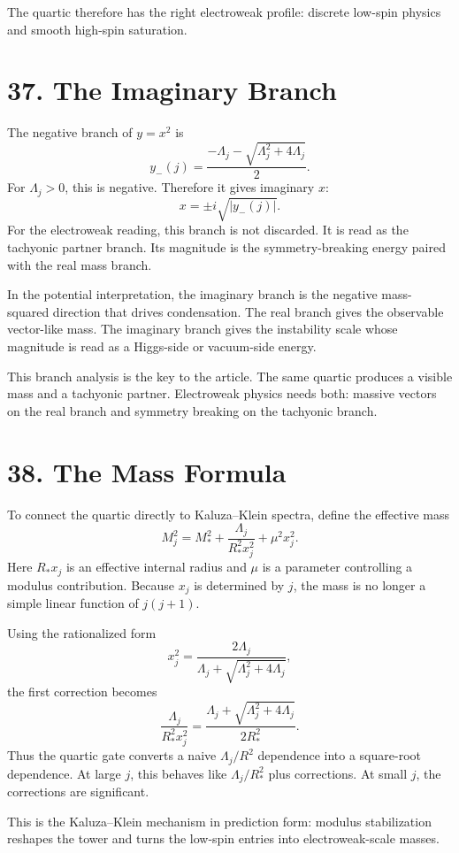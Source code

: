 \documentclass[11pt]{article}
\newcommand{\Lspin}{\Lambda_j}
\begin{document}
The quartic therefore has the right electroweak profile: discrete low-spin physics and smooth high-spin saturation.


\section*{37. The Imaginary Branch}

The negative branch of \(y=x^2\) is
\[
        y_-(j)=
        \frac{-\Lspin-\sqrt{\Lspin^2+4\Lspin}}{2}.
\]
For \(\Lspin>0\), this is negative. Therefore it gives imaginary \(x\):
\[
        x=\pm i\sqrt{|y_-(j)|}.
\]
For the electroweak reading, this branch is not discarded. It is read as the tachyonic partner branch. Its magnitude is the symmetry-breaking energy paired with the real mass branch.

In the potential interpretation, the imaginary branch is the negative mass-squared direction that drives condensation. The real branch gives the observable vector-like mass. The imaginary branch gives the instability scale whose magnitude is read as a Higgs-side or vacuum-side energy.

This branch analysis is the key to the article. The same quartic produces a visible mass and a tachyonic partner. Electroweak physics needs both: massive vectors on the real branch and symmetry breaking on the tachyonic branch.


\section*{38. The Mass Formula}

To connect the quartic directly to Kaluza--Klein spectra, define the effective mass
\[
        M_j^2=M_*^2+\frac{\Lspin}{R_*^2x_j^2}+\mu^2x_j^2 .
\]
Here \(R_*x_j\) is an effective internal radius and \(\mu\) is a parameter controlling a modulus contribution. Because \(x_j\) is determined by \(j\), the mass is no longer a simple linear function of \(j(j+1)\).

Using the rationalized form
\[
        x_j^2=\frac{2\Lspin}{\Lspin+\sqrt{\Lspin^2+4\Lspin}},
\]
the first correction becomes
\[
        \frac{\Lspin}{R_*^2x_j^2}
        =
        \frac{\Lspin+\sqrt{\Lspin^2+4\Lspin}}{2R_*^2}.
\]
Thus the quartic gate converts a naive \(\Lspin/R^2\) dependence into a square-root dependence. At large \(j\), this behaves like \(\Lspin/R_*^2\) plus corrections. At small \(j\), the corrections are significant.

This is the Kaluza--Klein mechanism in prediction form: modulus stabilization reshapes the tower and turns the low-spin entries into electroweak-scale masses.
\end{document}
